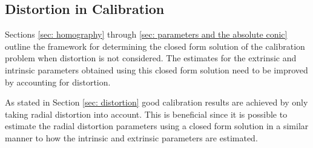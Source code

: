 \documentclass[12pt,oneside,openany,a4paper, %
english, %
masters-t, goldenblock]{usthesis}
\begin{document}


\subsection{Distortion in Calibration}
Sections \ref{sec: homography} through \ref{sec: parameters and the absolute conic} outline the framework for determining the closed form solution of the calibration problem when distortion is not considered. The estimates for the extrinsic and intrinsic parameters obtained using this closed form solution need to be improved by accounting for distortion. 

As stated in Section \ref{sec: distortion} good calibration results are achieved by only taking radial distortion into account. This is beneficial since it is possible to estimate the radial distortion parameters using a closed form solution in a similar manner to how the intrinsic and extrinsic parameters are estimated.



\end{document}
